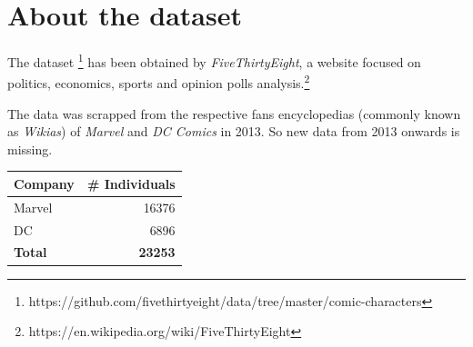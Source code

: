 \newpage
\section{About the dataset}
The dataset
\footnote{https://github.com/fivethirtyeight/data/tree/master/comic-characters} has been obtained by \textit{FiveThirtyEight}, a website focused on politics, economics, sports and opinion polls analysis.\footnote{https://en.wikipedia.org/wiki/FiveThirtyEight}

The data was scrapped from the respective fans encyclopedias (commonly known as \textit{Wikias}) of \textit{Marvel} and \textit{DC Comics} in 2013. So new data from 2013 onwards is missing.

\begin{center}
  \begin{tabular}{lr}
\textbf{Company} & \textbf{\# Individuals} \\ \hline
Marvel & 16376 \\
DC & 6896 \\
\textbf{Total} & \textbf{23253}
\end{tabular}
\end{center}

